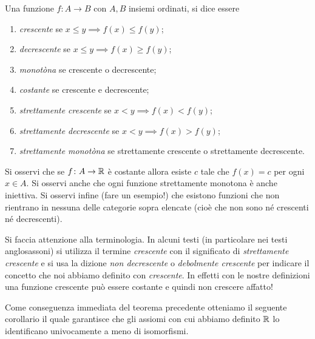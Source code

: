 \begin{definition}
  \label{def:monotonia}%
  \mymark{***}%
  Una funzione $f\colon A \to B$ con $A,B$ insiemi ordinati, si
  dice essere
  \begin{enumerate}
  \item \emph{crescente}%
%
 se $x \le y \implies f(x) \le f(y)$;
  \item \emph{decrescente}%
%
 se $x \le y \implies f(x) \ge f(y)$;
  \item \emph{monotòna}%
%
 se crescente o decrescente;
  \item \emph{costante}%
%
 se crescente e decrescente;
  \item \emph{strettamente crescente}%
%
 se $x<y \implies f(x) < f(y)$;
  \item \emph{strettamente decrescente}%
%
 se $x<y \implies f(x) > f(y)$;
  \item \emph{strettamente monotòna}%
%
 se strettamente crescente o strettamente decrescente.
  \end{enumerate}
\end{definition}

Si osservi che se $f\colon A \to {\mathbb R}$ è costante allora esiste $c$ tale che
$f(x)=c$ per ogni $x\in A$. 
Si osservi anche che ogni funzione strettamente monotona è anche iniettiva. Si osservi infine (fare un esempio!) che esistono funzioni che non rientrano in nessuna delle categorie sopra elencate (cioè che non sono né crescenti né decrescenti).

Si faccia attenzione alla terminologia.
In alcuni testi (in particolare nei testi anglosassoni) si utilizza il termine
\emph{crescente} con il significato di \emph{strettamente crescente} 
e si usa la dizione \emph{non decrescente} o \emph{debolmente crescente} 
per indicare il concetto che noi abbiamo definito con \emph{crescente}. 
In effetti con le nostre definizioni una funzione crescente può essere costante
e quindi non crescere affatto!


Come conseguenza immediata del teorema precedente otteniamo il seguente corollario il quale
garantisce che gli assiomi con cui abbiamo definito ${\mathbb R}$
lo identificano univocamente a meno di isomorfismi.

